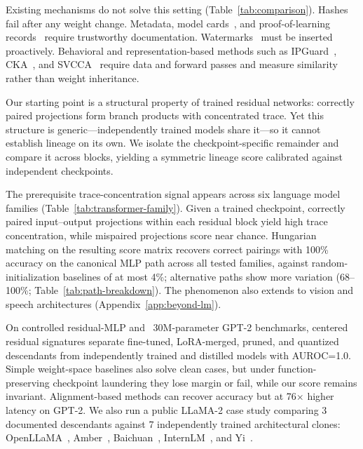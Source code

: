Existing mechanisms do not solve this setting (Table~\ref{tab:comparison}). Hashes fail after any weight change. Metadata, model cards~\citep{mitchell2019model}, and proof-of-learning records~\citep{jia2021proofoflearning} require trustworthy documentation. Watermarks~\citep{uchida2017embedding,adi2018turning} must be inserted proactively. Behavioral and representation-based methods such as IPGuard~\citep{cao2021ipguard}, CKA~\citep{kornblith2019similarity}, and SVCCA~\citep{raghu2017svcca} require data and forward passes and measure similarity rather than weight inheritance.

Our starting point is a structural property of trained residual networks: correctly paired projections form branch products with concentrated trace. Yet this structure is generic---independently trained models share it---so it cannot establish lineage on its own. We isolate the checkpoint-specific remainder and compare it across blocks, yielding a symmetric lineage score calibrated against independent checkpoints.

The prerequisite trace-concentration signal appears across six language model families (Table~\ref{tab:transformer-family}). Given a trained checkpoint, correctly paired input--output projections within each residual block yield high trace concentration, while mispaired projections score near chance. Hungarian matching on the resulting score matrix recovers correct pairings with 100\% accuracy on the canonical MLP path across all tested families, against random-initialization baselines of at most 4\%; alternative paths show more variation (68--100\%; Table~\ref{tab:path-breakdown}). The phenomenon also extends to vision and speech architectures (Appendix~\ref{app:beyond-lm}).

On controlled residual-MLP and ~30M-parameter GPT-2 benchmarks, centered residual signatures separate fine-tuned, LoRA-merged, pruned, and quantized descendants from independently trained and distilled models with AUROC=1.0. Simple weight-space baselines also solve clean cases, but under function-preserving checkpoint laundering they lose margin or fail, while our score remains invariant. Alignment-based methods can recover accuracy but at 76$\times$ higher latency on GPT-2. We also run a public LLaMA-2 case study comparing 3 documented descendants against 7 independently trained architectural clones: OpenLLaMA~\citep{geng2023openllama}, Amber~\citep{liu2023llm360}, Baichuan~\citep{yang2023baichuan}, InternLM~\citep{cai2024internlm2}, and Yi~\citep{young2024yi}.

